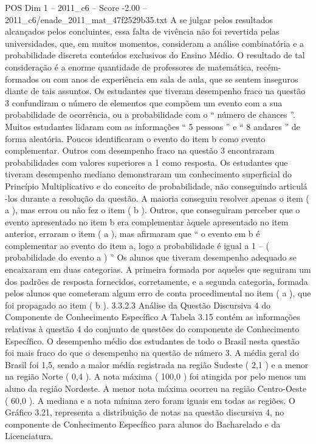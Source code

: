 \begin{textsample}{POS Dim 1 – 2011\_c6 – Score -2.00 – 2011\_c6/enade\_2011\_mat\_47f2529b35.txt}
A se julgar pelos resultados alcançados pelos concluintes, essa falta de vivência não foi revertida pelas universidades, que, em muitos momentos, consideram a análise combinatória e a probabilidade discreta conteúdos exclusivos do Ensino Médio.
O resultado de tal consideração é a enorme quantidade de professores de matemática, recém-formados ou com anos de experiência em sala de aula, que se sentem inseguros diante de tais assuntos.
Os estudantes que tiveram desempenho fraco na questão 3 confundiram o número de elementos que compõem um evento com a sua probabilidade de ocorrência, ou a probabilidade com o “ número de chances ”.
Muitos estudantes lidaram com as informações “ 5 pessoas ” e “ 8 andares ” de forma aleatória.
Poucos identificaram o evento do item b como evento complementar.
Outros com desempenho fraco na questão 3 encontraram probabilidades com valores superiores a 1 como resposta.
Os estudantes que tiveram desempenho mediano demonstraram um conhecimento superficial do Princípio Multiplicativo e do conceito de probabilidade, não conseguindo articulá -los durante a resolução da questão.
A maioria conseguiu resolver apenas o item ( a ), mas errou ou não fez o item ( b ).
Outros, que conseguiram perceber que o evento apresentado no item b era complementar àquele apresentado no item anterior, erraram o item ( a ), mas afirmaram que “ o evento em b é complementar ao evento do item a, logo a probabilidade é igual a 1 – ( probabilidade do evento a ) ” Os alunos que tiveram desempenho adequado se encaixaram em duas categorias.
A primeira formada por aqueles que seguiram um dos padrões de resposta fornecidos, corretamente, e a segunda categoria, formada pelos alunos que cometeram algum erro de conta procedimental no item ( a ), que foi propagado ao item ( b ). 3.3.2.3 Análise da Questão Discursiva 4 do Componente de Conhecimento Específico A Tabela 3.15 contém as informações relativas à questão 4 do conjunto de questões do componente de Conhecimento Específico.
O desempenho médio dos estudantes de todo o Brasil nesta questão foi mais fraco do que o desempenho na questão de número 3.
A média geral do Brasil foi 1,5, sendo a maior média registrada na região Sudeste ( 2,1 ) e a menor na região Norte ( 0,4 ).
A nota máxima ( 100,0 ) foi atingida por pelo menos um aluno da região Nordeste.
A menor nota máxima ocorreu na região Centro-Oeste ( 60,0 ).
A mediana e a nota mínima zero foram iguais em todas as regiões.
O Gráfico 3.21, representa a distribuição de notas na questão discursiva 4, no componente de Conhecimento Específico para alunos do Bacharelado e da Licenciatura.

\end{textsample}
